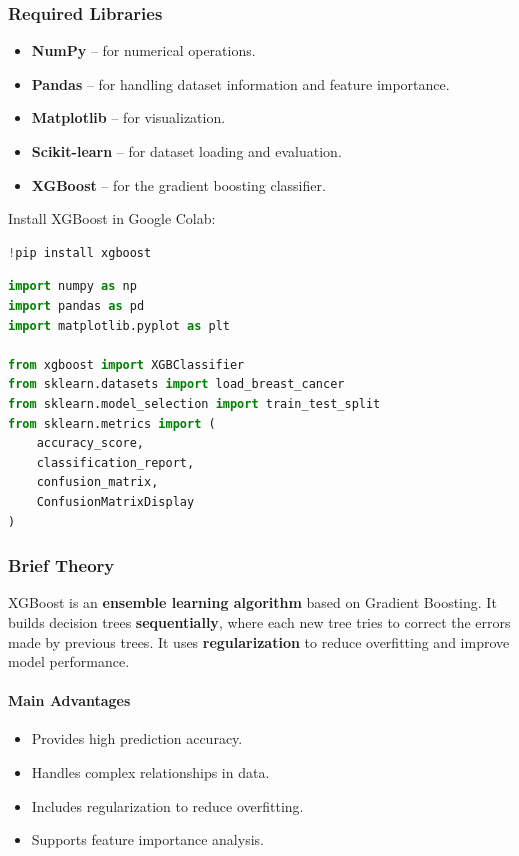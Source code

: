 \documentclass[a4paper,11pt]{article}
\begin{document}
\subsubsection{Required Libraries}
\begin{itemize}
    \item \textbf{NumPy} -- for numerical operations.
    \item \textbf{Pandas} -- for handling dataset information and feature importance.
    \item \textbf{Matplotlib} -- for visualization.
    \item \textbf{Scikit-learn} -- for dataset loading and evaluation.
    \item \textbf{XGBoost} -- for the gradient boosting classifier.
\end{itemize}

Install XGBoost in Google Colab:
\begin{lstlisting}[language=Python, caption={Install xgboost}]
!pip install xgboost
\end{lstlisting}

\begin{lstlisting}[language=Python, caption={Required Imports}]
import numpy as np
import pandas as pd
import matplotlib.pyplot as plt

from xgboost import XGBClassifier
from sklearn.datasets import load_breast_cancer
from sklearn.model_selection import train_test_split
from sklearn.metrics import (
    accuracy_score,
    classification_report,
    confusion_matrix,
    ConfusionMatrixDisplay
)
\end{lstlisting}

\subsubsection{Brief Theory}
XGBoost is an \textbf{ensemble learning algorithm} based on Gradient Boosting. It builds decision trees \textbf{sequentially}, where each new tree tries to correct the errors made by previous trees. It uses \textbf{regularization} to reduce overfitting and improve model performance.

\paragraph{Main Advantages}
\begin{itemize}
    \item Provides high prediction accuracy.
    \item Handles complex relationships in data.
    \item Includes regularization to reduce overfitting.
    \item Supports feature importance analysis.
\end{itemize}
\end{document}
